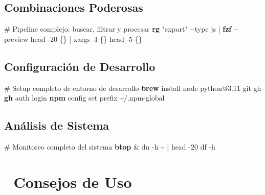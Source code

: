 \documentclass[
  11pt,
  letterpaper,
  oneside,
  openany]{scrbook}
\newenvironment{Shaded}{}{}
\newcommand{\AttributeTok}[1]{\textcolor[rgb]{0.84,0.23,0.29}{#1}}
\newcommand{\CommentTok}[1]{\textcolor[rgb]{0.42,0.45,0.49}{#1}}
\newcommand{\ExtensionTok}[1]{\textcolor[rgb]{0.84,0.23,0.29}{\textbf{#1}}}
\newcommand{\FunctionTok}[1]{\textcolor[rgb]{0.44,0.26,0.76}{#1}}
\newcommand{\KeywordTok}[1]{\textcolor[rgb]{0.84,0.23,0.29}{#1}}
\newcommand{\NormalTok}[1]{\textcolor[rgb]{0.14,0.16,0.18}{#1}}
\newcommand{\StringTok}[1]{\textcolor[rgb]{0.01,0.18,0.38}{#1}}
\begin{document}
\subsection{Combinaciones Poderosas}\label{combinaciones-poderosas}

\begin{Shaded}
\begin{Highlighting}[]
\CommentTok{\# Pipeline complejo: buscar, filtrar y procesar}
\ExtensionTok{rg} \StringTok{"export"} \AttributeTok{{-}{-}type}\NormalTok{ js }\KeywordTok{|} \ExtensionTok{fzf} \AttributeTok{{-}{-}preview} \StringTok{\textquotesingle{}head {-}20 \{\}\textquotesingle{}} \KeywordTok{|} \FunctionTok{xargs} \AttributeTok{{-}I}\NormalTok{ \{\} head }\AttributeTok{{-}5}\NormalTok{ \{\}}
\end{Highlighting}
\end{Shaded}

\subsection{Configuración de
Desarrollo}\label{configuraciuxf3n-de-desarrollo}

\begin{Shaded}
\begin{Highlighting}[]
\CommentTok{\# Setup completo de entorno de desarrollo}
\ExtensionTok{brew}\NormalTok{ install node python@3.11 git gh}
\ExtensionTok{gh}\NormalTok{ auth login}
\ExtensionTok{npm}\NormalTok{ config set prefix \textasciitilde{}/.npm{-}global}
\end{Highlighting}
\end{Shaded}

\subsection{Análisis de Sistema}\label{anuxe1lisis-de-sistema}

\begin{Shaded}
\begin{Highlighting}[]
\CommentTok{\# Monitoreo completo del sistema}
\ExtensionTok{btop} \KeywordTok{\&} 
\FunctionTok{du} \AttributeTok{{-}h}\NormalTok{ \textasciitilde{} }\KeywordTok{|} \FunctionTok{head} \AttributeTok{{-}20}
\FunctionTok{df} \AttributeTok{{-}h}
\end{Highlighting}
\end{Shaded}

\section{🎯 Consejos de Uso}\label{consejos-de-uso}
\end{document}
